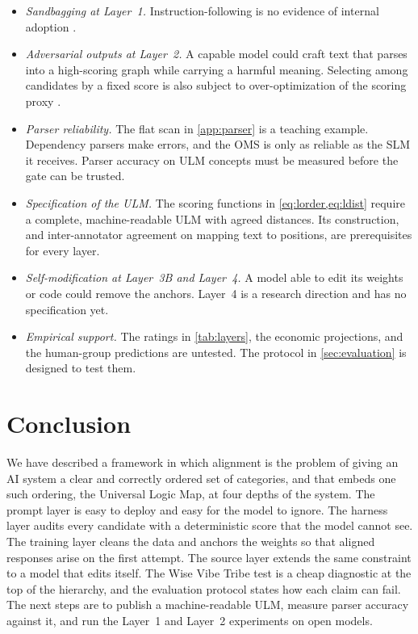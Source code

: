 \documentclass[twocolumn]{ulpaper}
\begin{document}
\begin{itemize}
  \item \emph{Sandbagging at Layer~1.} Instruction-following is no evidence of internal adoption \citep{vanderweij2024sandbagging}.
  \item \emph{Adversarial outputs at Layer~2.} A capable model could craft text that parses into a high-scoring graph while carrying a harmful meaning. Selecting among candidates by a fixed score is also subject to over-optimization of the scoring proxy \citep{gao2023scaling,goodhart1975problems}.
  \item \emph{Parser reliability.} The flat scan in \cref{app:parser} is a teaching example. Dependency parsers make errors, and the OMS is only as reliable as the SLM it receives. Parser accuracy on ULM concepts must be measured before the gate can be trusted.
  \item \emph{Specification of the ULM.} The scoring functions in \cref{eq:lorder,eq:ldist} require a complete, machine-readable ULM with agreed distances. Its construction, and inter-annotator agreement on mapping text to positions, are prerequisites for every layer.
  \item \emph{Self-modification at Layer~3B and Layer~4.} A model able to edit its weights or code could remove the anchors. Layer~4 is a research direction and has no specification yet.
  \item \emph{Empirical support.} The ratings in \cref{tab:layers}, the economic projections, and the human-group predictions are untested. The protocol in \cref{sec:evaluation} is designed to test them.
\end{itemize}

\section{Conclusion}
\label{sec:conclusion}

We have described a framework in which alignment is the problem of giving an AI system a clear and correctly ordered set of categories, and that embeds one such ordering, the Universal Logic Map, at four depths of the system. The prompt layer is easy to deploy and easy for the model to ignore. The harness layer audits every candidate with a deterministic score that the model cannot see. The training layer cleans the data and anchors the weights so that aligned responses arise on the first attempt. The source layer extends the same constraint to a model that edits itself. The Wise Vibe Tribe test is a cheap diagnostic at the top of the hierarchy, and the evaluation protocol states how each claim can fail. The next steps are to publish a machine-readable ULM, measure parser accuracy against it, and run the Layer~1 and Layer~2 experiments on open models.
\end{document}
